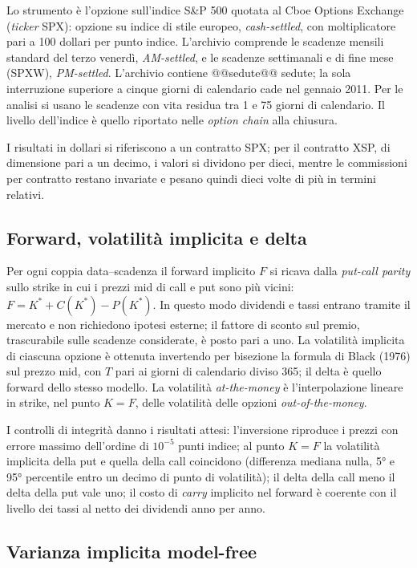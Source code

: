 \documentclass[11pt,a4paper]{article}
\begin{document}
Lo strumento è l'opzione sull'indice S\&P 500 quotata al Cboe Options Exchange (\emph{ticker} SPX): opzione su indice di stile europeo, \emph{cash-settled}, con moltiplicatore pari a 100 dollari per punto indice. L'archivio comprende le scadenze mensili standard del terzo venerdì, \emph{AM-settled}, e le scadenze settimanali e di fine mese (SPXW), \emph{PM-settled}. L'archivio contiene @@sedute@@ sedute; la sola interruzione superiore a cinque giorni di calendario cade nel gennaio 2011. Per le analisi si usano le scadenze con vita residua tra 1 e 75 giorni di calendario. Il livello dell'indice è quello riportato nelle \emph{option chain} alla chiusura.

I risultati in dollari si riferiscono a un contratto SPX; per il contratto XSP, di dimensione pari a un decimo, i valori si dividono per dieci, mentre le commissioni per contratto restano invariate e pesano quindi dieci volte di più in termini relativi.

\subsection{Forward, volatilità implicita e delta}

Per ogni coppia data--scadenza il forward implicito $F$ si ricava dalla \emph{put-call parity} sullo strike in cui i prezzi mid di call e put sono più vicini: $F = K^\ast + C(K^\ast) - P(K^\ast)$. In questo modo dividendi e tassi entrano tramite il mercato e non richiedono ipotesi esterne; il fattore di sconto sul premio, trascurabile sulle scadenze considerate, è posto pari a uno. La volatilità implicita di ciascuna opzione è ottenuta invertendo per bisezione la formula di Black (1976) sul prezzo mid, con $T$ pari ai giorni di calendario diviso 365; il delta è quello forward dello stesso modello. La volatilità \emph{at-the-money} è l'interpolazione lineare in strike, nel punto $K=F$, delle volatilità delle opzioni \emph{out-of-the-money}.

I controlli di integrità danno i risultati attesi: l'inversione riproduce i prezzi con errore massimo dell'ordine di $10^{-5}$ punti indice; al punto $K=F$ la volatilità implicita della put e quella della call coincidono (differenza mediana nulla, 5° e 95° percentile entro un decimo di punto di volatilità); il delta della call meno il delta della put vale uno; il costo di \emph{carry} implicito nel forward è coerente con il livello dei tassi al netto dei dividendi anno per anno.

\subsection{Varianza implicita model-free}
\end{document}
